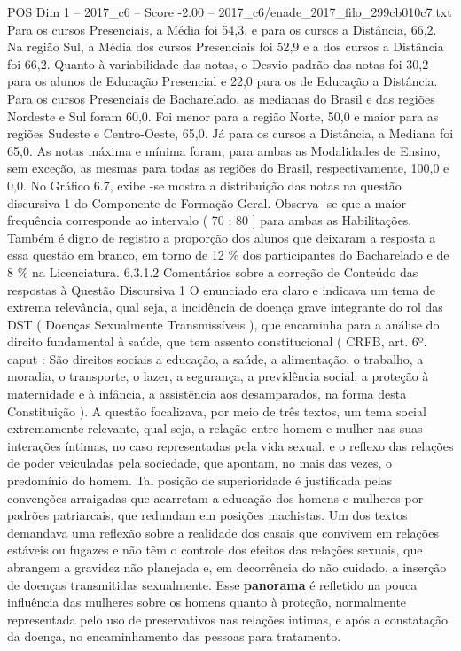 \begin{textsample}{POS Dim 1 – 2017\_c6 – Score -2.00 – 2017\_c6/enade\_2017\_filo\_299cb010c7.txt}
Para os cursos Presenciais, a Média foi 54,3, e para os cursos a Distância, 66,2.
Na região Sul, a Média dos cursos Presenciais foi 52,9 e a dos cursos a Distância foi 66,2.
Quanto à variabilidade das notas, o Desvio padrão das notas foi 30,2 para os alunos de Educação Presencial e 22,0 para os de Educação a Distância.
Para os cursos Presenciais de Bacharelado, as medianas do Brasil e das regiões Nordeste e Sul foram 60,0.
Foi menor para a região Norte, 50,0 e maior para as regiões Sudeste e Centro-Oeste, 65,0.
Já para os cursos a Distância, a Mediana foi 65,0.
As notas máxima e mínima foram, para ambas as Modalidades de Ensino, sem exceção, as mesmas para todas as regiões do Brasil, respectivamente, 100,0 e 0,0.
No Gráfico 6.7, exibe -se mostra a distribuição das notas na questão discursiva 1 do Componente de Formação Geral.
Observa -se que a maior frequência corresponde ao intervalo ( 70 ; 80 ] para ambas as Habilitações.
Também é digno de registro a proporção dos alunos que deixaram a resposta a essa questão em branco, em torno de 12 \% dos participantes do Bacharelado e de 8 \% na Licenciatura. 6.3.1.2 Comentários sobre a correção de Conteúdo das respostas à Questão Discursiva 1 O enunciado era claro e indicava um tema de extrema relevância, qual seja, a incidência de doença grave integrante do rol das DST ( Doenças Sexualmente Transmissíveis ), que encaminha para a análise do direito fundamental à saúde, que tem assento constitucional ( CRFB, art. 6º. caput : São direitos sociais a educação, a saúde, a alimentação, o trabalho, a moradia, o transporte, o lazer, a segurança, a previdência social, a proteção à maternidade e à infância, a assistência aos desamparados, na forma desta Constituição ).
A questão focalizava, por meio de três textos, um tema social extremamente relevante, qual seja, a relação entre homem e mulher nas suas interações íntimas, no caso representadas pela vida sexual, e o reflexo das relações de poder veiculadas pela sociedade, que apontam, no mais das vezes, o predomínio do homem.
Tal posição de superioridade é justificada pelas convenções arraigadas que acarretam a educação dos homens e mulheres por padrões patriarcais, que redundam em posições machistas.
Um dos textos demandava uma reflexão sobre a realidade dos casais que convivem em relações estáveis ou fugazes e não têm o controle dos efeitos das relações sexuais, que abrangem a gravidez não planejada e, em decorrência do não cuidado, a inserção de doenças transmitidas sexualmente.
Esse \textbf{panorama} é refletido na pouca influência das mulheres sobre os homens quanto à proteção, normalmente representada pelo uso de preservativos nas relações intimas, e após a constatação da doença, no encaminhamento das pessoas para tratamento.

\end{textsample}
